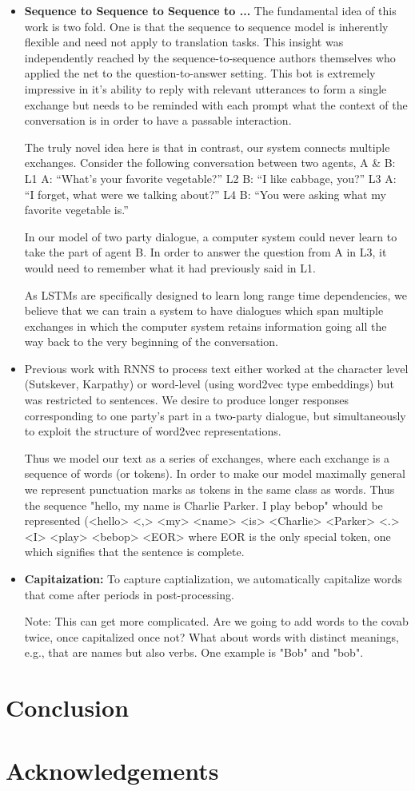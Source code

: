 \documentclass[]{article}
\begin{document}
\begin{itemize}


\item \textbf{ Sequence to Sequence to Sequence to ...} The fundamental idea of this work is two fold. One is that the sequence to sequence model is inherently flexible and need not apply to translation tasks. This insight was independently reached by the sequence-to-sequence authors themselves who applied the net to the question-to-answer setting. This bot is extremely impressive in it's ability to reply with relevant utterances to form a single exchange but needs to be reminded with each prompt what the context of the conversation is in order to have a passable interaction.

The truly novel idea here is that in contrast, our system connects multiple exchanges.
Consider the following conversation between two agents, A & B:
L1  A:  “What’s your favorite vegetable?”
L2  B:  “I like cabbage, you?”
L3  A:  “I forget, what were we talking about?”
L4  B:  “You were asking what my favorite vegetable is.”

In our model of two party dialogue, a computer system could never learn to take the part of agent B. In order to answer the question from A in L3, it would need to remember what it had previously said in L1.

As LSTMs are specifically designed to learn long range time dependencies, we believe that we can train a system to have dialogues which span multiple exchanges in which the computer system retains information going all the way back to the very beginning of the conversation.

\item Previous work with RNNS to process text either worked at the character level (Sutskever, Karpathy) or word-level (using word2vec type embeddings) but was restricted to sentences. We desire to produce longer responses corresponding to one party's part in a two-party dialogue, but simultaneously to exploit the structure of word2vec representations.

Thus we model our text as a series of exchanges, where each exchange is a sequence of words (or tokens). In order to make our model maximally general we represent punctuation marks as tokens in the same class as words. Thus the sequence "hello, my name is Charlie Parker. I play bebop" whould be represented (<hello> <,> <my> <name> <is> <Charlie> <Parker> <.> <I> <play> <bebop> <EOR> where EOR is the only special token, one which signifies that the sentence is complete.

\item \textbf{Capitaization:} To capture captialization, we automatically capitalize words that come after periods in post-processing.

Note: This can get more complicated. Are we going to add words to the covab twice, once capitalized once not? What about words with distinct meanings, e.g., that are names but also verbs. One example is "Bob" and "bob".

\end{itemize}


\section{Conclusion}
\section{Acknowledgements}


\end{document}

